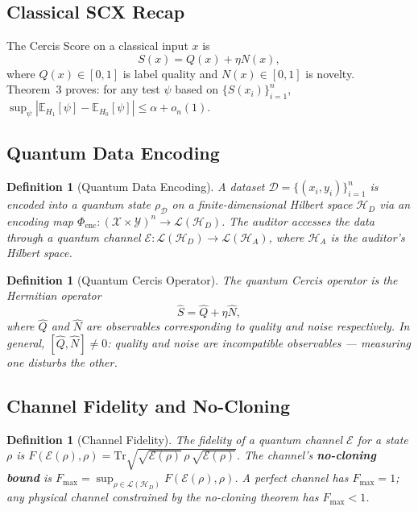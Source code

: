 \documentclass[12pt,a4paper]{article}
\newtheorem{definition}[theorem]{Definition}
\newcommand{\E}{\mathbb{E}}
\newcommand{\cX}{\mathcal{X}}
\newcommand{\cY}{\mathcal{Y}}
\newcommand{\cD}{\mathcal{D}}
\newcommand{\cH}{\mathcal{H}}
\newcommand{\cL}{\mathcal{L}}
\newcommand{\cE}{\mathcal{E}}
\newcommand{\Tr}{\mathrm{Tr}}
\begin{document}
\subsection{Classical SCX Recap}

The Cercis Score on a classical input $x$ is
\begin{equation}\label{eq:cercis-classical}
    S(x) = Q(x) + \eta N(x),
\end{equation}
where $Q(x)\in[0,1]$ is label quality and $N(x)\in[0,1]$ is novelty.
Theorem~3 proves: for any test $\psi$ based on $\{S(x_i)\}_{i=1}^n$,
$\sup_\psi|\E_{H_1}[\psi]-\E_{H_0}[\psi]| \leq \alpha + o_n(1)$.

\subsection{Quantum Data Encoding}

\begin{definition}[Quantum Data Encoding]
\label{def:quantum-encoding}
A dataset $\cD=\{(x_i,y_i)\}_{i=1}^n$ is encoded into a quantum state
$\rho_{\cD}$ on a finite-dimensional Hilbert space $\cH_D$ via an encoding map
$\Phi_{\mathrm{enc}}: (\cX\times\cY)^n \to \cL(\cH_D)$.  The auditor accesses
the data through a quantum channel
$\cE: \cL(\cH_D) \to \cL(\cH_A)$, where $\cH_A$ is the auditor's Hilbert space.
\end{definition}

\begin{definition}[Quantum Cercis Operator]
\label{def:quantum-cercis}
The quantum Cercis operator is the Hermitian operator
\begin{equation}\label{eq:quantum-cercis-op}
    \hat{S} = \hat{Q} + \eta \hat{N},
\end{equation}
where $\hat{Q}$ and $\hat{N}$ are observables corresponding to quality and
noise respectively.  In general, $[\hat{Q},\hat{N}]\neq0$: quality and noise
are \emph{incompatible observables} — measuring one disturbs the other.
\end{definition}

\subsection{Channel Fidelity and No-Cloning}

\begin{definition}[Channel Fidelity]
\label{def:channel-fidelity}
The fidelity of a quantum channel $\cE$ for a state $\rho$ is
$F(\cE(\rho),\rho) = \Tr\sqrt{\sqrt{\cE(\rho)}\,\rho\,\sqrt{\cE(\rho)}}$.
The channel's \textbf{no-cloning bound} is
$F_{\max} = \sup_{\rho\in\cL(\cH_D)} F(\cE(\rho),\rho)$.
A perfect channel has $F_{\max}=1$; any physical channel constrained by the
no-cloning theorem has $F_{\max}<1$.
\end{definition}
\end{document}

